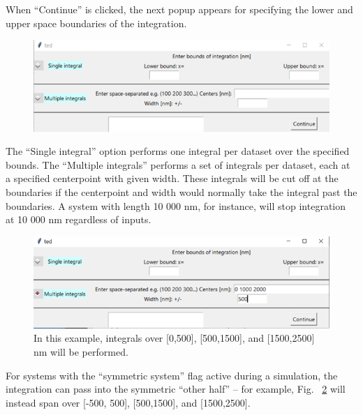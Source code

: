 \documentclass[11pt,letterpaper,titlepage]{article}
\begin{document}
		\par When “Continue” is clicked, the next popup appears for specifying the lower and upper space boundaries of the integration.
		
		\begin{figure}[H]
			\label{fig:integration_getbounds_blank}
			\centering
			\includegraphics{"integration_getbounds_blank"}
		\end{figure}
	
		\par The “Single integral” option performs one integral per dataset over the specified bounds. The “Multiple integrals” performs a set of integrals per dataset, each at a specified centerpoint with given width. These integrals will be cut off at the boundaries if the centerpoint and width would normally take the integral past the boundaries. A system with length 10 000 nm, for instance, will stop integration at 10 000 nm regardless of inputs.
		
		\begin{figure}[H]
			\label{fig:integration_getbounds_example}
			\centering
			\includegraphics{"integration_getbounds_example"}
			\caption{In this example, integrals over [0,500], [500,1500], and [1500,2500] nm will be performed.}
			
		\end{figure}
		
		\par For systems with the “symmetric system” flag active during a simulation, the integration can pass into the symmetric “other half” – for example, Fig. ~\ref{fig:integration_getbounds_example} will instead span over [-500, 500], [500,1500], and [1500,2500].
		
\end{document}
